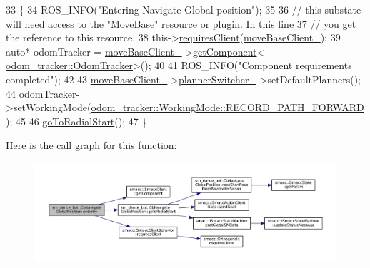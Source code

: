 \begin{DoxyCode}
33   \{
34     ROS\_INFO(\textcolor{stringliteral}{"Entering Navigate Global position"});
35 
36     \textcolor{comment}{// this substate will need access to the "MoveBase" resource or plugin. In this line}
37     \textcolor{comment}{// you get the reference to this resource.}
38     this->\hyperlink{classsmacc_1_1SmaccClientBehavior_a917f001e763a1059af337bf4e164f542}{requiresClient}(\hyperlink{classsm__dance__bot_1_1CbNavigateGlobalPosition_a6b070ea39c113269c9b7f7732cb9e033}{moveBaseClient\_});
39     \textcolor{keyword}{auto}* odomTracker = \hyperlink{classsm__dance__bot_1_1CbNavigateGlobalPosition_a6b070ea39c113269c9b7f7732cb9e033}{moveBaseClient\_}->\hyperlink{classsmacc_1_1ISmaccClient_adef78db601749ca63c19e74a27cb88cc}{getComponent}<
      \hyperlink{classodom__tracker_1_1OdomTracker}{odom\_tracker::OdomTracker}>();
40 
41     ROS\_INFO(\textcolor{stringliteral}{"Component requirements completed"});
42 
43     \hyperlink{classsm__dance__bot_1_1CbNavigateGlobalPosition_a6b070ea39c113269c9b7f7732cb9e033}{moveBaseClient\_}->\hyperlink{classsmacc_1_1ClMoveBaseZ_a712e0df77c9629930e03cbb4c539b485}{plannerSwitcher\_}->setDefaultPlanners();
44     odomTracker->setWorkingMode(\hyperlink{namespaceodom__tracker_a4daf27fd157b1a481fdfd6f90de00b88a989d06a586bcf9520889228da7faa643}{odom\_tracker::WorkingMode::RECORD\_PATH\_FORWARD}
      );
45 
46     \hyperlink{classsm__dance__bot_1_1CbNavigateGlobalPosition_a0832f7a7f205cc483be012aef9501312}{goToRadialStart}();
47   \}
\end{DoxyCode}


Here is the call graph for this function\+:
\nopagebreak
\begin{figure}[H]
\begin{center}
\leavevmode
\includegraphics[width=350pt]{classsm__dance__bot_1_1CbNavigateGlobalPosition_a281fe5c962ca5004f44e929159991c6a_cgraph}
\end{center}
\end{figure}


